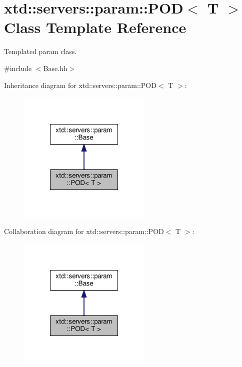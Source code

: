 \hypertarget{classxtd_1_1servers_1_1param_1_1POD}{\section{xtd\-:\-:servers\-:\-:param\-:\-:P\-O\-D$<$ T $>$ Class Template Reference}
\label{classxtd_1_1servers_1_1param_1_1POD}
}


Templated param class.  




{\ttfamily \#include $<$Base.\-hh$>$}



Inheritance diagram for xtd\-:\-:servers\-:\-:param\-:\-:P\-O\-D$<$ T $>$\-:
\nopagebreak
\begin{figure}[H]
\begin{center}
\leavevmode
\includegraphics[width=180pt]{classxtd_1_1servers_1_1param_1_1POD__inherit__graph}
\end{center}
\end{figure}


Collaboration diagram for xtd\-:\-:servers\-:\-:param\-:\-:P\-O\-D$<$ T $>$\-:
\nopagebreak
\begin{figure}[H]
\begin{center}
\leavevmode
\includegraphics[width=180pt]{classxtd_1_1servers_1_1param_1_1POD__coll__graph}
\end{center}
\end{figure}
